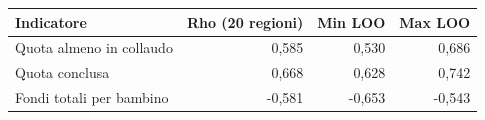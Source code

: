 \begin{tabular}{lrrr}
\toprule
Indicatore & Rho (20 regioni) & Min LOO & Max LOO \\
\midrule
Quota almeno in collaudo & 0,585 & 0,530 & 0,686 \\
Quota conclusa & 0,668 & 0,628 & 0,742 \\
Fondi totali per bambino & -0,581 & -0,653 & -0,543 \\
\bottomrule
\end{tabular}
